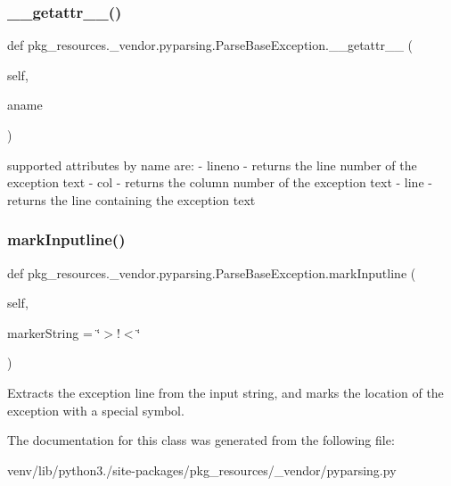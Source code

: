 \subsubsection{\texorpdfstring{\+\_\+\+\_\+getattr\+\_\+\+\_\+()}{\_\_getattr\_\_()}}
{\footnotesize\ttfamily def pkg\+\_\+resources.\+\_\+vendor.\+pyparsing.\+Parse\+Base\+Exception.\+\_\+\+\_\+getattr\+\_\+\+\_\+ (\begin{DoxyParamCaption}\item[{}]{self,  }\item[{}]{aname }\end{DoxyParamCaption})}

\begin{DoxyVerb}supported attributes by name are:
    - lineno - returns the line number of the exception text
    - col - returns the column number of the exception text
    - line - returns the line containing the exception text
\end{DoxyVerb}
 \mbox{\label{classpkg__resources_1_1__vendor_1_1pyparsing_1_1_parse_base_exception_a6c4c8cd6caa4b1b7630557b453e89911}} 
\subsubsection{\texorpdfstring{mark\+Inputline()}{markInputline()}}
{\footnotesize\ttfamily def pkg\+\_\+resources.\+\_\+vendor.\+pyparsing.\+Parse\+Base\+Exception.\+mark\+Inputline (\begin{DoxyParamCaption}\item[{}]{self,  }\item[{}]{marker\+String = {\ttfamily \char`\"{}$>$!$<$\char`\"{}} }\end{DoxyParamCaption})}

\begin{DoxyVerb}Extracts the exception line from the input string, and marks
   the location of the exception with a special symbol.
\end{DoxyVerb}
 

The documentation for this class was generated from the following file\+:\begin{DoxyCompactItemize}
\item 
venv/lib/python3./site-\/packages/pkg\+\_\+resources/\+\_\+vendor/pyparsing.\+py\end{DoxyCompactItemize}
